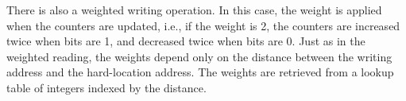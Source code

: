 There is also a weighted writing operation. In this case, the weight is applied when the counters are updated, i.e., if the weight is 2, the counters are increased twice when bits are 1, and decreased twice when bits are 0. Just as in the weighted reading, the weights depend only on the distance between the writing address and the hard-location address. The weights are retrieved from a lookup table of integers indexed by the distance.
